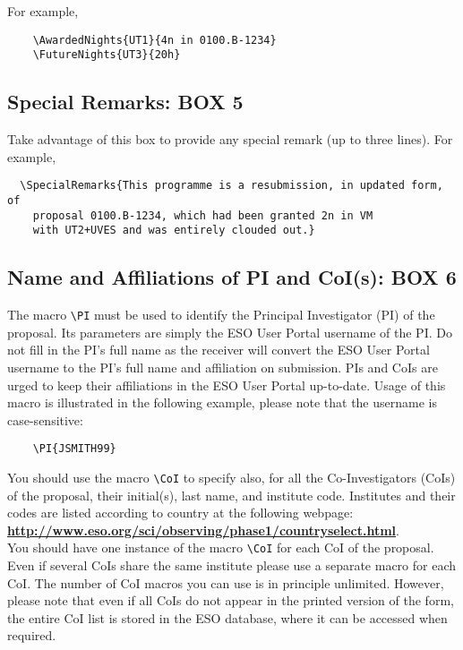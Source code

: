 \documentclass{article}
\begin{document}
For example,
\begin{verbatim}
    \AwardedNights{UT1}{4n in 0100.B-1234}
    \FutureNights{UT3}{20h}
\end{verbatim} 

\subsection{Special Remarks: {\bf BOX 5}}

Take advantage of this box to provide any special remark (up to three
lines). For example,
\begin{verbatim}
  \SpecialRemarks{This programme is a resubmission, in updated form, of
    proposal 0100.B-1234, which had been granted 2n in VM
    with UT2+UVES and was entirely clouded out.}
\end{verbatim}

\subsection{Name and Affiliations of PI and CoI(s): {\bf BOX 6}}

The macro \verb|\PI| must be used to identify the Principal
Investigator (PI) of the proposal. Its parameters are simply the 
ESO User Portal username of the PI. Do not fill in the PI's full
name as the receiver will convert the ESO User Portal username
to the PI's full name and affiliation on submission. PIs and CoIs are urged to keep their affiliations in the ESO User Portal up-to-date.
Usage of this macro is illustrated in the following example, please note that the username is case-sensitive:
\begin{verbatim}
    \PI{JSMITH99}
\end{verbatim}

You should use the macro \verb|\CoI| to specify also, for
all the Co-Investigators (CoIs) of the proposal, their initial(s),
last name, and institute code. Institutes and their codes are listed 
according to country at the following webpage:\\
\href{http://www.eso.org/sci/observing/phase1/countryselect.html}
{\bf\underline{http://www.eso.org/sci/observing/phase1/countryselect.html}}.\\
You should have one instance of the macro \verb|\CoI| for each CoI of the
proposal. Even if several CoIs share the same institute
please use a separate macro for each CoI. The number of CoI macros you can 
use is in principle unlimited. However, please note that 
even if all CoIs do not appear in the printed version of the form,
the entire  CoI list is stored in the ESO database, where it
can be accessed when required.
\end{document}
